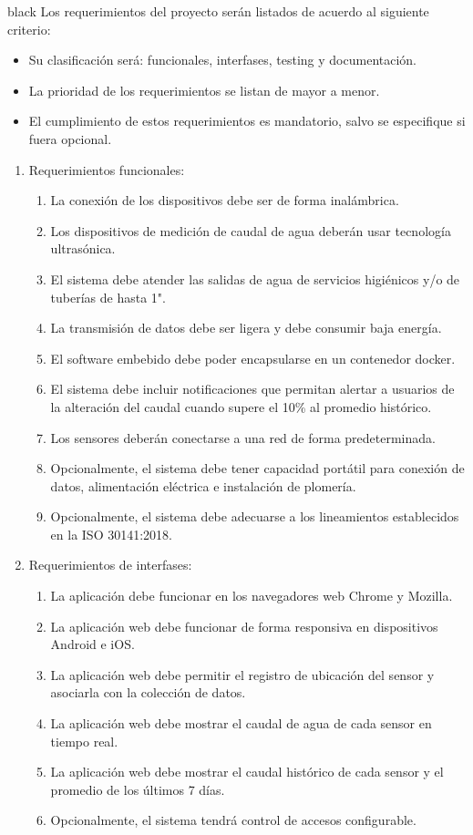 \documentclass[
11pt, %
codirector, %
]{charter}
\begin{document}
\begin{consigna}{black}
Los requerimientos del proyecto serán listados de acuerdo al siguiente criterio:
\begin{itemize}
	\item Su clasificación será: funcionales, interfases, testing y documentación.
	\item La prioridad de los requerimientos se listan de mayor a menor.
	\item El cumplimiento de estos requerimientos es mandatorio, salvo se especifique si fuera opcional.
\end{itemize}

\begin{enumerate}

\item Requerimientos funcionales:
	\begin{enumerate}
		\item La conexión de los dispositivos debe ser de forma inalámbrica.
		\item Los dispositivos de medición de caudal de agua deberán usar tecnología ultrasónica.
		\item El sistema debe atender las salidas de agua de servicios higiénicos y/o de tuberías de hasta 1".
		\item La transmisión de datos debe ser ligera y debe consumir baja energía. 
		\item El software embebido debe poder encapsularse en un contenedor docker.
		\item El sistema debe incluir notificaciones que permitan alertar a usuarios de la alteración del caudal cuando supere el 10\% al promedio histórico.	
		\item Los sensores deberán conectarse a una red de forma predeterminada.	
		\item Opcionalmente, el sistema debe tener capacidad portátil para conexión de datos, alimentación eléctrica e instalación de plomería.
		\item Opcionalmente, el sistema debe adecuarse a los lineamientos establecidos en la ISO 30141:2018.
	\end{enumerate}

\item Requerimientos de interfases:
	\begin{enumerate}
		\item La aplicación debe funcionar en los navegadores web Chrome y Mozilla.
		\item La aplicación web debe funcionar de forma responsiva en dispositivos Android e iOS.
		\item La aplicación web debe permitir el registro de ubicación del sensor y asociarla con la colección de datos.
		\item La aplicación web debe mostrar el caudal de agua de cada sensor en tiempo real. 
		\item La aplicación web debe mostrar el caudal histórico de cada sensor y el promedio de los últimos 7 días.
		\item Opcionalmente, el sistema tendrá control de accesos configurable.
	\end{enumerate}


\end{enumerate}
\end{consigna}
\end{document}
